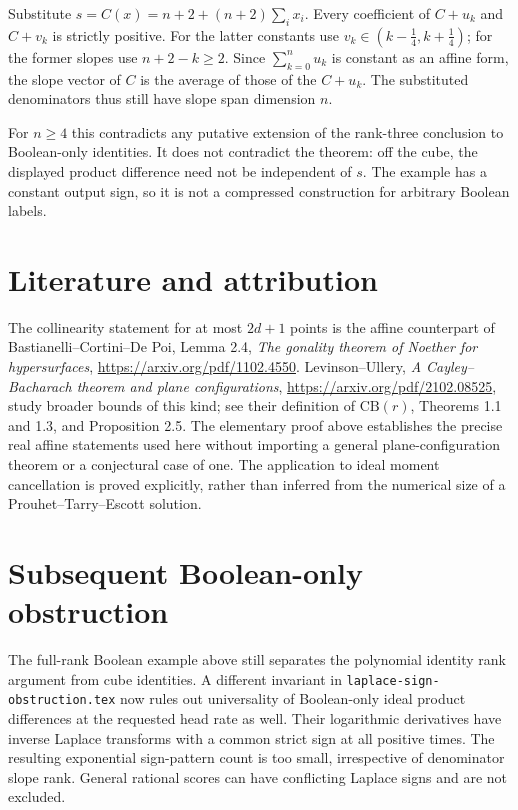 \documentclass[11pt]{article}
\begin{document}
Substitute
$s=C(x)=n+2+(n+2)\sum_i x_i$. Every coefficient of $C+u_k$ and
$C+v_k$ is strictly positive. For the latter constants use
$v_k\in(k-\frac14,k+\frac14)$; for the former slopes use
$n+2-k\ge2$. Since $\sum_{k=0}^n u_k$ is constant as an affine
form, the slope vector of $C$ is the average of those of the
$C+u_k$. The substituted denominators thus still have slope span
dimension $n$.

For $n\ge4$ this contradicts any putative extension of the rank-three
conclusion to Boolean-only identities. It does not contradict the
theorem: off the cube, the displayed product difference need not be
independent of $s$. The example has a constant output sign, so it is
not a compressed construction for arbitrary Boolean labels.

\section{Literature and attribution}

The collinearity statement for at most $2d+1$ points is the affine
counterpart of Bastianelli--Cortini--De Poi, Lemma 2.4,
\emph{The gonality theorem of Noether for hypersurfaces},
\url{https://arxiv.org/pdf/1102.4550}.
Levinson--Ullery, \emph{A Cayley--Bacharach theorem and plane
configurations}, \url{https://arxiv.org/pdf/2102.08525}, study broader
bounds of this kind; see their definition of $\mathrm{CB}(r)$,
Theorems 1.1 and 1.3, and Proposition 2.5.
The elementary proof above establishes the precise real affine statements
used here without importing a general plane-configuration theorem or a
conjectural case of one. The application to ideal moment cancellation is
proved explicitly, rather than inferred from the numerical size of a
Prouhet--Tarry--Escott solution.

\section{Subsequent Boolean-only obstruction}

The full-rank Boolean example above still separates the polynomial
identity rank argument from cube identities. A different invariant
in \texttt{laplace-sign-obstruction.tex} now rules out universality
of Boolean-only ideal product differences at the requested head
rate as well. Their logarithmic derivatives have inverse Laplace
transforms with a common strict sign at all positive times. The
resulting exponential sign-pattern count is too small, irrespective
of denominator slope rank. General rational scores can have
conflicting Laplace signs and are not excluded.
\end{document}
